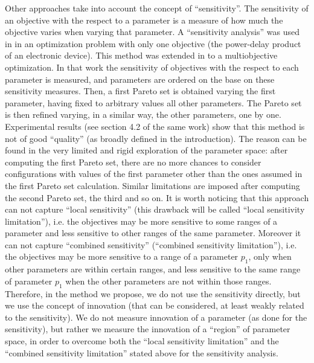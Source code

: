 Other approaches take into account the concept of ``sensitivity''.
The sensitivity of an objective with the respect to a parameter is
a measure of how much the objective varies when varying that parameter.
A ``sensitivity analysis'' was used in \cite{fornaciari_codes01} in an optimization
problem with only one objective (the power-delay product of an electronic
device). This method was extended in \cite{palesi_iwsoc02} to a multiobjective
optimization. In that work the sensitivity of objectives with
the respect to each parameter is measured, and parameters are ordered
on the base on these sensitivity measures. Then, a first Pareto set
is obtained varying the first parameter, having fixed to arbitrary
values all other parameters. The Pareto set is then refined varying,
in a similar way, the other parameters, one by one. Experimental results
(see section 4.2 of the same work) show that this method is not of
good ``quality'' (as broadly defined in the introduction). The reason
can be found in the very limited and rigid exploration of the parameter
space: after computing the first Pareto set, there are no more chances
to consider configurations with values of the first parameter other
than the ones assumed in the first Pareto set calculation. Similar
limitations are imposed after computing the second Pareto set, the
third and so on. It is worth noticing that this approach can not capture
``local sensitivity'' (this drawback will be called ``local sensitivity
limitation''), i.e. the objectives may be more sensitive to some
ranges of a parameter and less sensitive to other ranges of the same
parameter. Moreover it can not capture ``combined sensitivity''
(``combined sensitivity limitation''), i.e. the objectives may be
more sensitive to a range of a parameter $p_{1}$, only when other
parameters are within certain ranges, and less sensitive to the same
range of parameter $p_{1}$ when the other parameters are not within
those ranges. Therefore, in the method we propose, we do not use the
sensitivity directly, but we use the concept of innovation (that can
be considered, at least weakly related to the sensitivity). We do
not measure innovation of a parameter (as done for the sensitivity),
but rather we measure the innovation of a ``region'' of parameter
space, in order to overcome both the ``local sensitivity limitation''
and the ``combined sensitivity limitation'' stated above for the
sensitivity analysis.

